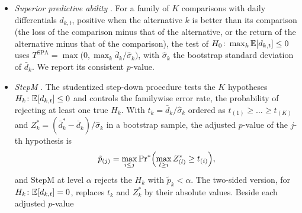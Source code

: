 \begin{itemize}
\begin{itemize}
    daily losses $L_{i,t}$, each step tests the equal predictive ability of the forecasts in $\mathcal M$ and, if it
    rejects, removes one of them. With $\bar d_{ij}$ the average of $L_{i,t} - L_{j,t}$ over $\mathcal O$ and
    $\bar d_{i\cdot}$ the average loss of forecast $i$ minus the average over $\mathcal M$, the two statistics are
    \[
      T_{\max} = \max_{i \in \mathcal M} t_{i\cdot}, \quad
      t_{i\cdot} = \frac{\bar d_{i\cdot}}{\sqrt{\widehat{\mathrm{var}}(\bar d_{i\cdot})}},
      \qquad
      T_R = \max_{i, j \in \mathcal M} |t_{ij}|, \quad
      t_{ij} = \frac{\bar d_{ij}}{\sqrt{\widehat{\mathrm{var}}(\bar d_{ij})}},
    \]
    and their elimination rules remove $\arg\max_i t_{i\cdot}$ and $\arg\max_i \max_j t_{ij}$, respectively. The
    variances and the null distributions of $T_{\max}$ and $T_R$ come from the bootstrap below, with the statistics
    recentred at their sample values. The elimination continues to the last forecast, so every forecast has an MCS
    $p$-value: the largest step $p$-value up to its removal, and one for the last forecast. The $(1-\alpha)$ model
    confidence set holds the forecasts whose $p$-value is at least $\alpha$; we report the 90\% and 75\% sets.
  \item \emph{Superior predictive ability} \citep{Hansen2005}. For a family of $K$ comparisons with daily
    differentials $d_{k,t}$, positive when the alternative $k$ is better than its comparison (the loss of the
    comparison minus that of the alternative, or the return of the alternative minus that of the comparison), the
    test of $H_0\colon \max_k \mathbb{E}[d_{k,t}] \le 0$ uses $T^{\mathrm{SPA}} = \max\bigl(0, \max_k \bar d_k/\hat\sigma_k\bigr)$,
    with $\hat\sigma_k$ the bootstrap standard deviation of $\bar d_k$. We report its consistent $p$-value.
  \item \emph{StepM} \citep{RomanoWolf2005}. The studentized step-down procedure tests the $K$ hypotheses
    $H_k\colon \mathbb{E}[d_{k,t}] \le 0$ and controls the familywise error rate, the probability of rejecting at least one
    true $H_k$. With $t_k = \bar d_k/\hat\sigma_k$ ordered as $t_{(1)} \ge \dots \ge t_{(K)}$ and
    $Z^{*}_k = (\bar d^{*}_k - \bar d_k)/\hat\sigma_k$ in a bootstrap sample, the adjusted $p$-value of the $j$-th
    hypothesis is
    \[
      \tilde p_{(j)} = \max_{i \le j} \Pr\nolimits^{*}\Bigl(\max_{l \ge i} Z^{*}_{(l)} \ge t_{(i)}\Bigr),
    \]
    and StepM at level $\alpha$ rejects the $H_k$ with $\tilde p_k < \alpha$. The two-sided version, for
    $H_k\colon \mathbb{E}[d_{k,t}] = 0$, replaces $t_k$ and $Z^{*}_k$ by their absolute values. Beside each adjusted $p$-value

\end{itemize}
\end{itemize}

